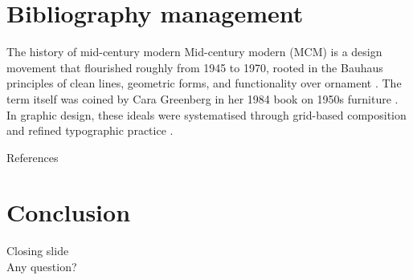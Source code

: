 \documentclass[aspectratio=169]{beamer}
\begin{document}
\section{Bibliography management}

\begin{frame}{The history of mid-century modern}
  Mid-century modern (MCM) is a design movement that flourished
  roughly from 1945 to 1970, rooted in the Bauhaus principles of
  clean lines, geometric forms, and functionality over ornament
  \parencite{wikipedia2024}. The term itself was coined by
  Cara Greenberg in her 1984 book on 1950s furniture
  \parencite{greenberg1984}. In graphic design, these ideals were
  systematised through grid-based composition
  \parencite{müller-brockmann1981} and refined typographic practice
  \parencite{bringhurst2004}.
\end{frame}

\begin{frame}{References}
  \printbibliography[heading=none]
\end{frame}


\section*{Conclusion}

{
\begin{frame}
  \begin{center}
    \Large
    Closing slide\\
    Any question?
  \end{center}
\end{frame}
}


\appendix
\end{document}
